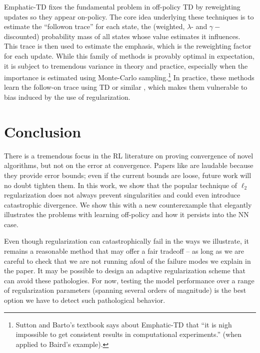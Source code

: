 Emphatic-TD \cite{sutton2016emphatic} fixes the fundamental problem in off-policy TD by reweighting updates so they appear on-policy. The core idea underlying these techniques is to estimate the ``followon trace'' for each state, the (weighted, $\lambda$- and $\gamma-$discounted) probability mass of all states whose value estimates it influences. This trace is then used to estimate the emphasis, which is the reweighting factor for each update. While this family of methods is provably optimal in expectation, it is subject to tremendous variance in theory and practice, especially when the importance is estimated using Monte-Carlo sampling.\footnote{Sutton and Barto's textbook \cite{sutton2020reinforcement} says about Emphatic-TD that ``it is
  nigh impossible to get consistent results in computational experiments.'' (when applied to Baird's example). } In practice, these methods learn the follow-on trace using TD \cite{jiang2021learning,zhang2020provably} or similar \cite{hasselt2021expected}, which makes them vulnerable to bias induced by the use of regularization.

\section{Conclusion}

There is a tremendous focus in the RL literature on proving convergence of novel algorithms, but not on the error at convergence. Papers like \cite{zhang2021breaking} are laudable because they provide error bounds; even if the current bounds are loose, future work will no doubt tighten them.
In this work, we show that the popular technique of $\ell_2$ regularization does not always prevent singularities and could even introduce catastrophic divergence. We show this with a new counterexample that elegantly illustrates the problems with learning off-policy and how it persists into the NN case.

Even though regularization can catastrophically fail in the ways we illustrate, it remains a reasonable method that may offer a fair tradeoff -- as long as we are careful to check that we are not running afoul of the failure modes we explain in the paper. It may be possible to design an adaptive regularization scheme that can avoid these pathologies. For now, testing the model performance over a range of regularization parameters (spanning several orders of magnitude) is the best option we have to detect such pathological behavior.

